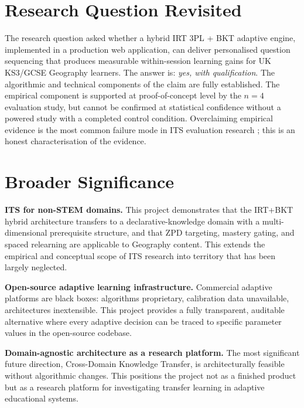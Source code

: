 \section{Research Question Revisited}
\label{sec:conc_rq}

The research question asked whether a hybrid IRT 3PL + BKT adaptive engine,
implemented in a production web application, can deliver personalised question
sequencing that produces measurable within-session learning gains for UK
KS3/GCSE Geography learners. The answer is: \textit{yes, with qualification}.
The algorithmic and technical components of the claim are fully established.
The empirical component is supported at proof-of-concept level by the $n = 4$
evaluation study, but cannot be confirmed at statistical confidence without a
powered study with a completed control condition. Overclaiming empirical
evidence is the most common failure mode in ITS evaluation research
\parencite{woolf2010}; this is an honest characterisation of the evidence.

\section{Broader Significance}
\label{sec:conc_significance}

\textbf{ITS for non-STEM domains.} This project demonstrates that the IRT+BKT
hybrid architecture transfers to a declarative-knowledge domain with a
multi-dimensional prerequisite structure, and that ZPD targeting, mastery
gating, and spaced relearning are applicable to Geography content. This extends
the empirical and conceptual scope of ITS research into territory that has been
largely neglected.

\textbf{Open-source adaptive learning infrastructure.} Commercial adaptive
platforms are black boxes: algorithms proprietary, calibration data unavailable,
architectures inextensible. This project provides a fully transparent, auditable
alternative where every adaptive decision can be traced to specific parameter
values in the open-source codebase.

\textbf{Domain-agnostic architecture as a research platform.} The most
significant future direction, Cross-Domain Knowledge Transfer, is
architecturally feasible without algorithmic changes. This positions the project
not as a finished product but as a research platform for investigating transfer
learning in adaptive educational systems.


